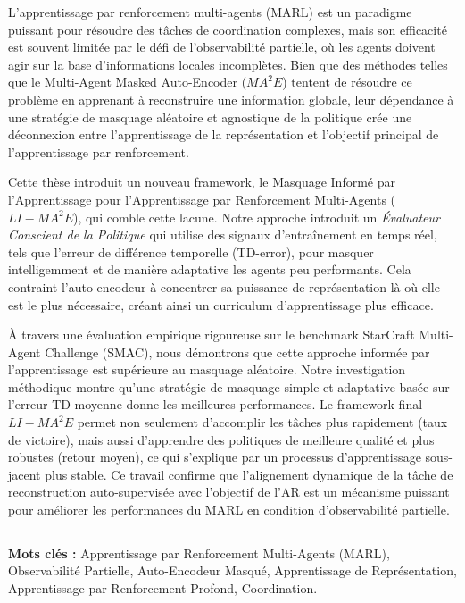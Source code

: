


L'apprentissage par renforcement multi-agents (MARL) est un paradigme puissant pour résoudre des tâches de coordination complexes, mais son efficacité est souvent limitée par le défi de l'observabilité partielle, où les agents doivent agir sur la base d'informations locales incomplètes. Bien que des méthodes telles que le Multi-Agent Masked Auto-Encoder (${MA}^2E$) tentent de résoudre ce problème en apprenant à reconstruire une information globale, leur dépendance à une stratégie de masquage aléatoire et agnostique de la politique crée une déconnexion entre l'apprentissage de la représentation et l'objectif principal de l'apprentissage par renforcement.

Cette thèse introduit un nouveau framework, le Masquage Informé par l'Apprentissage pour l'Apprentissage par Renforcement Multi-Agents ($LI-{MA}^2E$), qui comble cette lacune. Notre approche introduit un \textit{Évaluateur Conscient de la Politique} qui utilise des signaux d'entraînement en temps réel, tels que l'erreur de différence temporelle (TD-error), pour masquer intelligemment et de manière adaptative les agents peu performants. Cela contraint l'auto-encodeur à concentrer sa puissance de représentation là où elle est le plus nécessaire, créant ainsi un curriculum d'apprentissage plus efficace.

À travers une évaluation empirique rigoureuse sur le benchmark StarCraft Multi-Agent Challenge (SMAC), nous démontrons que cette approche informée par l'apprentissage est supérieure au masquage aléatoire. Notre investigation méthodique montre qu'une stratégie de masquage simple et adaptative basée sur l'erreur TD moyenne donne les meilleures performances. Le framework final $LI-{MA}^2E$ permet non seulement d'accomplir les tâches plus rapidement (taux de victoire), mais aussi d'apprendre des politiques de meilleure qualité et plus robustes (retour moyen), ce qui s'explique par un processus d'apprentissage sous-jacent plus stable. Ce travail confirme que l'alignement dynamique de la tâche de reconstruction auto-supervisée avec l'objectif de l'AR est un mécanisme puissant pour améliorer les performances du MARL en condition d'observabilité partielle.

\vspace{1cm}


\noindent\rule[2pt]{\textwidth}{0.5pt}

{\textbf{Mots clés :}}
Apprentissage par Renforcement Multi-Agents (MARL), Observabilité Partielle, Auto-Encodeur Masqué, Apprentissage de Représentation, Apprentissage par Renforcement Profond, Coordination.

